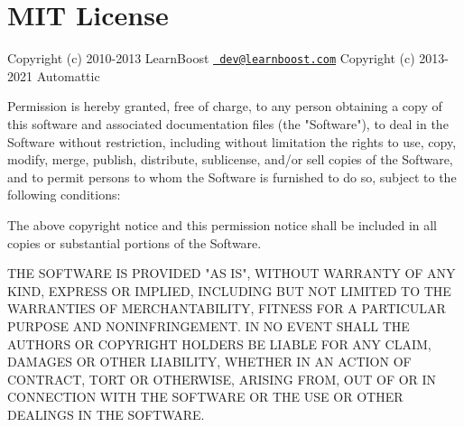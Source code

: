 \chapter{MIT License}
\hypertarget{md_node__modules_2mongoose_2_l_i_c_e_n_s_e}{}\label{md_node__modules_2mongoose_2_l_i_c_e_n_s_e}
\label{md_node__modules_2mongoose_2_l_i_c_e_n_s_e_autotoc_md2499}%
%


Copyright (c) 2010-\/2013 Learn\+Boost \href{mailto:dev@learnboost.com}{\texttt{ dev@learnboost.\+com}} Copyright (c) 2013-\/2021 Automattic

Permission is hereby granted, free of charge, to any person obtaining a copy of this software and associated documentation files (the "{}\+Software"{}), to deal in the Software without restriction, including without limitation the rights to use, copy, modify, merge, publish, distribute, sublicense, and/or sell copies of the Software, and to permit persons to whom the Software is furnished to do so, subject to the following conditions\+:

The above copyright notice and this permission notice shall be included in all copies or substantial portions of the Software.

THE SOFTWARE IS PROVIDED "{}\+AS IS"{}, WITHOUT WARRANTY OF ANY KIND, EXPRESS OR IMPLIED, INCLUDING BUT NOT LIMITED TO THE WARRANTIES OF MERCHANTABILITY, FITNESS FOR A PARTICULAR PURPOSE AND NONINFRINGEMENT. IN NO EVENT SHALL THE AUTHORS OR COPYRIGHT HOLDERS BE LIABLE FOR ANY CLAIM, DAMAGES OR OTHER LIABILITY, WHETHER IN AN ACTION OF CONTRACT, TORT OR OTHERWISE, ARISING FROM, OUT OF OR IN CONNECTION WITH THE SOFTWARE OR THE USE OR OTHER DEALINGS IN THE SOFTWARE. 